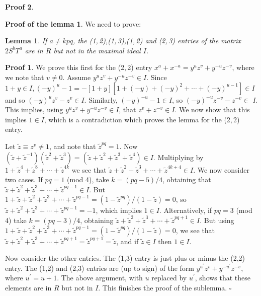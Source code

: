 \documentclass[reqno]{stml-l}
\theoremstyle{plain}
\newtheorem{lemma}[theorem]{Lemma}
\theoremstyle{definition}
\newtheorem*{proof*}{Proof}
\newtheorem*{proofl*}{Proof of the lemma}
\numberwithin{equation}{chapter}
\begin{document}
\begin{proof*}
\begin{proofl*}
We need to prove:
\end{proofl*}

\begin{lemma}\label{ch04:lem4.9}
If $a\neq kpq$, the \emph{(1,\,2),(1,\,3),(1,\,2)} and \emph{(2,\,3)} entries of the matrix $2S^{b}T^{a}$ are in $R$ but not in the maximal ideal $I$.
\end{lemma}

\begin{proof*}
We prove this first for the (2,\,2) entry $x^{a}+x^{-a}=y^{u}z^{v}+ y^{-u}z^{-v}$, where we note that $v\neq 0$. Assume $y^{u}z^{v}+y^{-u}z^{-v}\in I$. Since $1+y\in I,(-y)^{u}-1=-[1+y][1+(-y)+(-y)^{2}+\cdots+(-y)^{u-1}]\in I$ and so $(-y)^{u}z^{v}-z^{v}\in I$. Similarly, $(-y)^{-u}-1\in I$, so $(-y)^{-u}z^{-v}-z^{-v}\in$ \emph{I}. This implies, using $y^{u}z^{v}+y^{-u}z^{-v}\in I$, that $z^{v}+z^{-v}\in I$. We now show that this implies $1\in I$, which is a contradiction which proves the lemma for the (2,\,2) entry.

Let $\tilde{z}\equiv z^{v}\neq 1$, and note that $\tilde{z}^{pq}=1$. Now $(\tilde{z}+\tilde{z}^{-1})(\tilde{z}^{2}+\tilde{z}^{3})= (\tilde{z}+\tilde{z}^{2}+\tilde{z}^{3}+\tilde{z}^{4})\in I$. Multiplying by $1+\tilde{z}^{4}+\tilde{z}^{8}+\cdots+\tilde{z}^{4k}$ we see that $\tilde{z}+\tilde{z}^{2}+\tilde{z}^{3}+\cdots+\tilde{z}^{4k+4}\in I$. We now consider two cases. If $pq=1$ (mod 4), take $k=(pq-5)/4$, obtaining that $\tilde{z}+\tilde{z}^{2}+\tilde{z}^{3}+\cdots+\tilde{z}^{pq-1}\in I$. But $1+\tilde{z}+\tilde{z}^{2}+\tilde{z}^{3}+\cdots+\tilde{z}^{pq-1}=(1-\tilde{z}^{pq})/(1-\tilde{z})=0$, so $\tilde{z}+\tilde{z}^{2}+ \tilde{z}^{3}+\cdots+\tilde{z}^{pq-1}=-1$, which implies $1\in I$. Alternatively, if $pq=3$ (mod 4) take $k=(pq-3)/4$, obtaining $\tilde{z}+\tilde{z}^{2}+\tilde{z}^{3}+\cdots+\tilde{z}^{pq+1}\in I$. But using $1+\tilde{z}+\tilde{z}^{2}+\tilde{z}^{3}+\cdots+\tilde{z}^{pq-1}=(1-\tilde{z}^{pq})/(1-\tilde{z})=0$, we see that $\tilde{z}+\tilde{z}^{2}+\tilde{z}^{3}+\cdots+\tilde{z}^{pq+1}=\tilde{z}^{pq+1}=\tilde{z}$, and if $\tilde{z}\in I$ then $1\in I$.

Now consider the other entries. The (1,3) entry is just plus or minus the (2,2) entry. The (1,2) and (2,3) entries are (up to sign) of the form $y^{u^{\prime}}z^{v}+y^{-u^{\prime}}z^{-v}$, where $u^{\prime}=u+1$. The above argument, with $u$ replaced by $u^{\prime}$, shows that these elements are in $R$ but not in $I$. This finishes the proof of the sublemma.
\hfill$\square$
\end{proof*}


\end{proof*}
\end{document}
